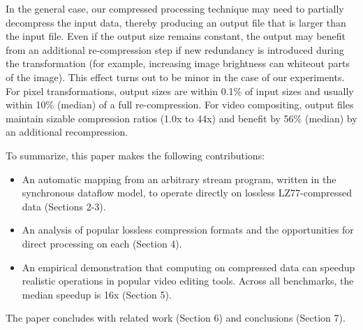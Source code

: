 In the general case, our compressed processing technique may need to
partially decompress the input data, thereby producing an output file
that is larger than the input file.  Even if the output size remains
constant, the output may benefit from an additional re-compression
step if new redundancy is introduced during the transformation (for
example, increasing image brightness can whiteout parts of the image).
This effect turns out to be minor in the case of our experiments.  For
pixel transformations, output sizes are within 0.1\% of input sizes
and usually within 10\% (median) of a full re-compression.  For video
compositing, output files maintain sizable compression ratios (1.0x to
44x) and benefit by 56\% (median) by an additional recompression.

To summarize, this paper makes the following contributions:
\begin{itemize}

\item An automatic mapping from an arbitrary stream program, written
in the synchronous dataflow model, to operate directly on lossless
LZ77-compressed data (Sections 2-3).

\item An analysis of popular lossless compression formats and the
opportunities for direct processing on each (Section 4).

\item An empirical demonstration that computing on compressed data can
speedup realistic operations in popular video editing tools.  Across
all benchmarks, the median speedup is 16x (Section 5).

\end{itemize}

The paper concludes with related work (Section 6) and conclusions
(Section 7).
